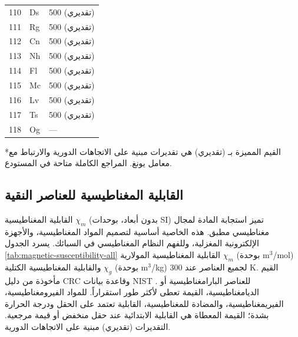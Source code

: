 \documentclass[11pt,a4paper]{article}
\begin{document}
\begin{otherlanguage}{arabic}
\begin{longtable}{p{0.6cm}p{1.2cm}p{2.5cm}}
			110& Ds & 500 (تقديري) \\
			111& Rg & 500 (تقديري) \\
			112& Cn & 500 (تقديري) \\
			113& Nh & 500 (تقديري) \\
			114& Fl & 500 (تقديري) \\
			115& Mc & 500 (تقديري) \\
			116& Lv & 500 (تقديري) \\
			117& Ts & 500 (تقديري) \\
			118& Og & — \\
			\bottomrule
		\end{longtable}
		*القيم المميزة بـ (تقديري) هي تقديرات مبنية على الاتجاهات الدورية والارتباط مع معامل يونغ. المراجع الكاملة متاحة في المستودع.
		
		\subsection{القابلية المغناطيسية للعناصر النقية}
		\label{subsec:magnetic-susceptibility}
		
		القابلية المغناطيسية \(\chi_m\) (بدون أبعاد، بوحدات SI) تميز استجابة المادة لمجال مغناطيسي مطبق. هذه الخاصية أساسية لتصميم المواد المغناطيسية، والأجهزة الإلكترونية المغزلية، وللفهم النظام المغناطيسي في السبائك. يسرد الجدول \ref{tab:magnetic-susceptibility-all} القابلية المغناطيسية المولارية \(\chi_m\) (بوحدة m\(^3\)/mol) والقابلية المغناطيسية الكتلية \(\chi_g\) (بوحدة m\(^3\)/kg) لجميع العناصر عند 300 K. القيم مأخوذة من دليل CRC \cite{CRC} وقاعدة بيانات NIST \cite{NIST}. للعناصر البارامغناطيسية أو الديامغناطيسية، القيمة تعطى لأكثر طور استقراراً. للمواد الفيرومغناطيسية، الفيريمغناطيسية، والمضادة للمغناطيسية، القابلية تعتمد على الحقل ودرجة الحرارة بشدة؛ القيمة المعطاة هي القابلية الابتدائية عند حقل منخفض أو قيمة مرجعية. التقديرات (تقديري) مبنية على الاتجاهات الدورية.
		

\end{otherlanguage}
\end{document}

